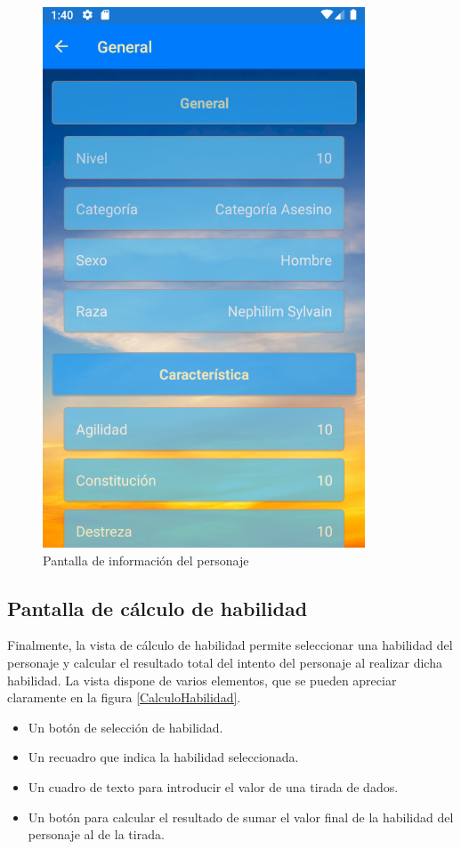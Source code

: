 \begin{figure}[H]
    \centering
    \includegraphics[scale=0.3]{Figures/Capturas/InformacionPersonaje.png}
    \caption{Pantalla de información del personaje}
    \label{InfoPersonaje}    
\end{figure}

\subsection{Pantalla de cálculo de habilidad}
Finalmente, la vista de cálculo de habilidad permite seleccionar una habilidad del personaje y 
calcular el resultado total del intento del personaje al realizar dicha habilidad. La vista dispone de varios elementos, 
que se pueden apreciar claramente en la figura \ref*{CalculoHabilidad}.
\begin{itemize}
    \item Un botón de selección de habilidad.
    \item Un recuadro que indica la habilidad seleccionada.
    \item Un cuadro de texto para introducir el valor de una tirada de dados.
    \item Un botón para calcular el resultado de sumar el valor final de la habilidad del personaje al de la tirada.
\end{itemize}

